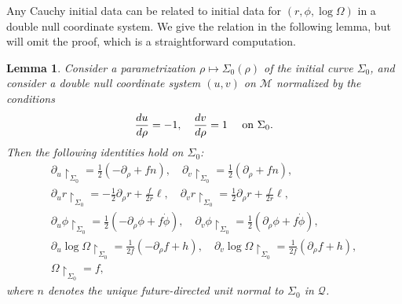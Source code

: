 \documentclass[10pt, reqno]{amsart}
\newtheorem{lemma}[theorem]{Lemma}
\theoremstyle{definition}
\theoremstyle{remark}
\numberwithin{equation}{section}
\newcommand{\ud}{d}
\newcommand{\rd}{\partial}
\newcommand{\0}{\emptyset}
\newcommand{\Sgm}{\Sigma}
\newcommand{\Omg}{\Omega}
\newcommand{\calM}{\mathcal M}
\begin{document}
Any Cauchy initial data can be related to initial data for $(r, \phi, \log \Omg)$ in a double null coordinate system. We give the relation in the following lemma, but will omit the proof, which is a straightforward computation.
\begin{lemma} \label{lem:cauchy-to-char}
Consider a parametrization $\rho \mapsto \Sgm_{0}(\rho)$ of the initial curve $\Sgm_{0}$, and consider a double null coordinate system $(u, v)$ on $\calM$ normalized by the conditions
\begin{equation*}
\frac{\ud u}{\ud \rho} = -1, \quad 
\frac{\ud v}{\ud \rho} = 1 \quad \hbox{ on } \Sgm_{0}.
\end{equation*}
Then the following identities hold on $\Sgm_{0}$: 
\begin{gather*}
	\rd_{u} \restriction_{\Sgm_{0}} = \frac{1}{2} (-\rd_{\rho} + f n), \quad 
	\rd_{v} \restriction_{\Sgm_{0}} = \frac{1}{2} (\rd_{\rho} + f n), \\
	\rd_{u} r \restriction_{\Sgm_{0}} = - \frac{1}{2} \rd_{\rho} r + \frac{f}{2 r} \ell, \quad
	\rd_{v} r \restriction_{\Sgm_{0}} = \frac{1}{2} \rd_{\rho} r + \frac{f}{2 r} \ell, \\
	\rd_{u} \phi \restriction_{\Sgm_{0}} = \frac{1}{2} ( - \rd_{\rho} \phi + f \dot{\phi}), \quad
	\rd_{v} \phi \restriction_{\Sgm_{0}} = \frac{1}{2} ( \rd_{\rho} \phi + f \dot{\phi}), \\
	\rd_{u} \log \Omg \restriction_{\Sgm_{0}} = \frac{1}{2f} (- \rd_{\rho} f + h), \quad
	\rd_{v} \log \Omg \restriction_{\Sgm_{0}} = \frac{1}{2f} (\rd_{\rho} f + h),\\
	\Omg \restriction_{\Sgm_{0}}=f,
\end{gather*}
where $n$ denotes the unique future-directed unit normal to $\Sgm_0$ in $\mathcal Q$.
\end{lemma}



\end{document}
